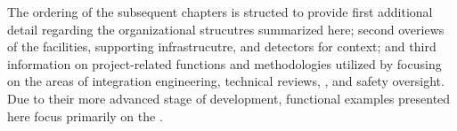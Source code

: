 The ordering of the subsequent chapters is structed to provide first
additional detail regarding the organizational strucutres summarized
here; second overiews of the facilities, supporting infrastrucutre,
and detectors for context; and third information on project-related
functions and methodologies utilized by  
focusing on the areas of integration engineering, technical reviews,
, and safety oversight.  Due to their more advanced stage
of development, functional examples presented here focus primarily on
the  .
